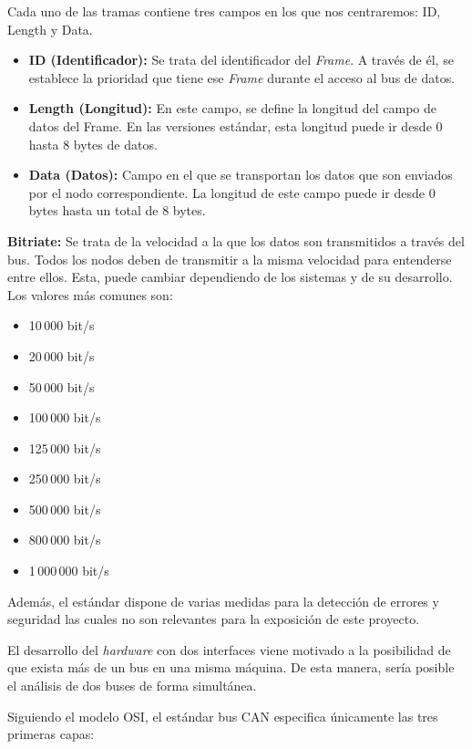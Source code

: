 Cada uno de las tramas contiene tres campos en los que nos centraremos: ID, Length y Data.

\begin{itemize}
\item
\textbf{ID (Identificador):} Se trata del identificador del \emph{Frame}. A través de él, se establece la prioridad que tiene ese \emph{Frame} durante el acceso al bus de datos.
\item
\textbf{Length (Longitud):} En este campo, se define la longitud del campo de datos del Frame. En las versiones estándar, esta longitud puede ir desde 0 hasta 8 bytes de datos.
\item
\textbf{Data (Datos):} Campo en el que se transportan los datos que son enviados por el nodo correspondiente. La longitud de este campo puede ir desde 0 bytes hasta un total de 8 bytes.
\end{itemize}



\textbf{Bitriate:} Se trata de la velocidad a la que los datos son transmitidos a través del bus. Todos los nodos deben de transmitir a la misma velocidad para entenderse entre ellos. Esta, puede cambiar dependiendo de los sistemas y de su desarrollo.
Los valores más comunes son:

\begin{itemize}
\tightlist
\item
10\,000 bit/s
\item
20\,000 bit/s
\item
50\,000 bit/s
\item
100\,000 bit/s
\item
125\,000 bit/s
\item
250\,000 bit/s
\item
500\,000 bit/s
\item
800\,000 bit/s
\item
1\,000\,000 bit/s
\end{itemize}


Además, el estándar dispone de varias medidas para la detección de errores y seguridad las cuales no son relevantes para la exposición de este proyecto.

El desarrollo del \emph{hardware} con dos interfaces viene motivado a la posibilidad de que exista más de un bus en una misma máquina. De esta manera, sería posible el análisis de dos buses de forma simultánea.

Siguiendo el modelo OSI\cite{osi:can}, el estándar bus CAN especifica únicamente las tres primeras capas:

